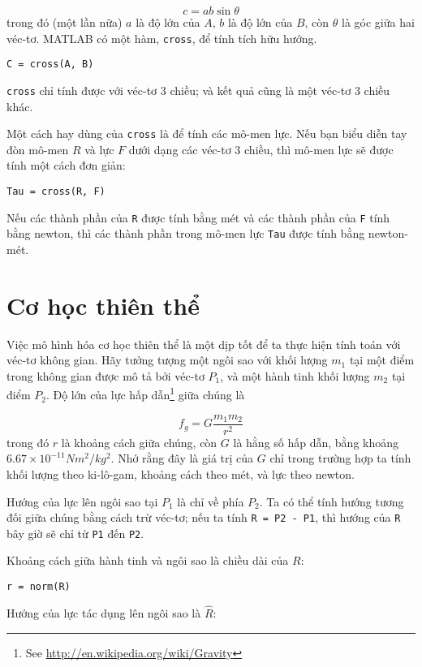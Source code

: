 \documentclass[12pt]{book}
\begin{document}
\[ c = a b \sin \theta \]
%
trong đó (một lần nữa) $a$ là độ lớn của $A$, $b$ là độ lớn của 
$B$, còn $\theta$ là góc giữa hai véc-tơ.  MATLAB có một hàm, 
{\tt cross}, để tính tích hữu hướng.

\begin{verbatim}
C = cross(A, B)
\end{verbatim}
%
{\tt cross} chỉ tính được với véc-tơ 3 chiều; và kết quả cũng là một 
véc-tơ 3 chiều khác.

Một cách hay dùng của {\tt cross} là để tính các mô-men lực. Nếu bạn 
biểu diễn tay đòn mô-men $R$ và lực $F$ dưới dạng các véc-tơ 3
chiều, thì mô-men lực sẽ được tính một cách đơn giản:

\begin{verbatim}
Tau = cross(R, F)
\end{verbatim}

Nếu các thành phần của {\tt R} được tính bằng mét và các thành 
phần của {\tt F} tính bằng newton, thì các thành phần trong mô-men lực 
{\tt Tau} được tính bằng newton-mét.



\section{Cơ học thiên thể}

Việc mô hình hóa cơ học thiên thể là một dịp tốt để ta thực hiện tính 
toán với véc-tơ không gian. Hãy tưởng tượng một ngôi sao với 
khối lượng $m_1$ tại một điểm trong không gian được mô tả bởi 
véc-tơ $P_1$, và một hành tinh khối lượng $m_2$ tại điểm $P_2$.  
Độ lớn của lực hấp dẫn\footnote{See
\url{http://en.wikipedia.org/wiki/Gravity}} giữa chúng là 

\[ f_g = G \frac{m_1 m_2}{r^2}  \]
%
trong đó $r$ là khoảng cách giữa chúng, còn $G$ là hằng số hấp dẫn,
bằng khoảng $6.67 \times 10^{-11} N m^2 /
kg^2$.  Nhớ rằng đây là giá trị của $G$ chỉ trong trường hợp ta tính 
khối lượng theo ki-lô-gam, khoảng cách theo mét, và lực theo newton.

Hướng của lực lên ngôi sao tại $P_1$ là chỉ về phía $P_2$. Ta có thể 
tính hướng tương đối giữa chúng bằng cách trừ véc-tơ; nếu ta tính 
{\tt R = P2 - P1}, thì hướng của {\tt R} bây giờ sẽ chỉ từ {\tt P1} đến {\tt P2}.

Khoảng cách giữa hành tinh và ngôi sao là chiều dài của $R$:

\begin{verbatim}
r = norm(R)
\end{verbatim}
%
Hướng của lực tác dụng lên ngôi sao là $\hat{R}$:
\end{document}
